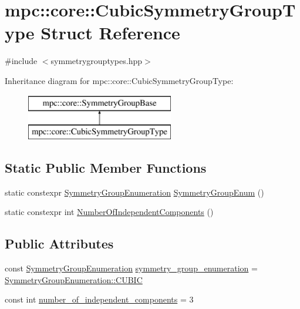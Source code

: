 \hypertarget{structmpc_1_1core_1_1_cubic_symmetry_group_type}{}\section{mpc\+:\+:core\+:\+:Cubic\+Symmetry\+Group\+Type Struct Reference}
\label{structmpc_1_1core_1_1_cubic_symmetry_group_type}


{\ttfamily \#include $<$symmetrygrouptypes.\+hpp$>$}

Inheritance diagram for mpc\+:\+:core\+:\+:Cubic\+Symmetry\+Group\+Type\+:\begin{figure}[H]
\begin{center}
\leavevmode
\includegraphics[height=2.000000cm]{structmpc_1_1core_1_1_cubic_symmetry_group_type}
\end{center}
\end{figure}
\subsection*{Static Public Member Functions}
\begin{DoxyCompactItemize}
\item 
static constexpr \mbox{\hyperlink{namespacempc_1_1core_a9d979684062547055a0ef5c13077bad8}{Symmetry\+Group\+Enumeration}} \mbox{\hyperlink{structmpc_1_1core_1_1_cubic_symmetry_group_type_a04e950092a3b0a6e2d35110c49fac745}{Symmetry\+Group\+Enum}} ()
\item 
static constexpr int \mbox{\hyperlink{structmpc_1_1core_1_1_cubic_symmetry_group_type_a7775973b3c21a9cef3999c72516c8061}{Number\+Of\+Independent\+Components}} ()
\end{DoxyCompactItemize}
\subsection*{Public Attributes}
\begin{DoxyCompactItemize}
\item 
const \mbox{\hyperlink{namespacempc_1_1core_a9d979684062547055a0ef5c13077bad8}{Symmetry\+Group\+Enumeration}} \mbox{\hyperlink{structmpc_1_1core_1_1_cubic_symmetry_group_type_a9418ba4ab74fc37ae6ef6faa0d2aeca0}{symmetry\+\_\+group\+\_\+enumeration}} = \mbox{\hyperlink{namespacempc_1_1core_a9d979684062547055a0ef5c13077bad8accd681e34e5e40fbce74618c3ccffcff}{Symmetry\+Group\+Enumeration\+::\+C\+U\+B\+IC}}
\item 
const int \mbox{\hyperlink{structmpc_1_1core_1_1_cubic_symmetry_group_type_a4e0518ed7fc1d0ab8e04cf7f549b62a5}{number\+\_\+of\+\_\+independent\+\_\+components}} = 3
\end{DoxyCompactItemize}


